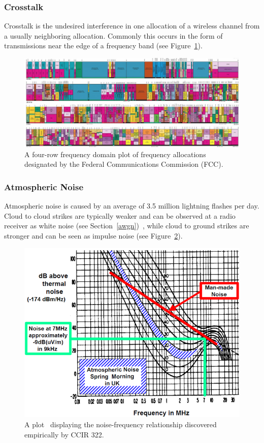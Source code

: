 \subsubsection{Crosstalk}
Crosstalk is the undesired interference in one allocation of a wireless channel from a usually neighboring allocation. Commonly this occurs in the form of transmissions near the edge of a frequency band (see Figure~\ref{fig:fcc}).

\FloatBarrier
\begin{figure}[ht!]
	\centering	\includegraphics[width=1\textwidth,keepaspectratio]{figs/fcc.jpeg}
    \caption{A four-row frequency domain plot of frequency allocations designated by the Federal Communications Commission (FCC).} 
\label{fig:fcc}      
\end{figure}
\FloatBarrier

\subsubsection{Atmospheric Noise}
Atmospheric noise is caused by an average of 3.5 million lightning flashes per day. Cloud to cloud strikes are typically weaker and can be observed at a radio receiver as white noise (see Section~\ref{awgn})~\cite{lightning}, while cloud to ground strikes are stronger and can be seen as impulse noise (see Figure~\ref{fig:light}).

\FloatBarrier
\begin{figure}[ht!]
	\centering	\includegraphics[width=1\textwidth,keepaspectratio]{figs/Atmosphericnoise.png}
    \caption{A plot~\cite{lightning} displaying the noise-frequency relationship discovered empirically by CCIR 322.} 
\label{fig:light}      
\end{figure}
\FloatBarrier

